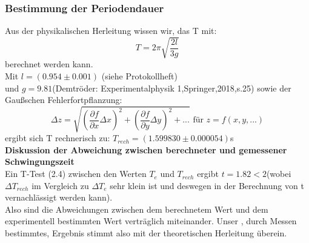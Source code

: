 \documentclass[11pt,a4paper]{article}
\begin{document}
	\subsubsection{Bestimmung der Periodendauer}
	Aus der physikalischen Herleitung wissen wir, das T mit:
	\begin{equation}
	T=2\pi \sqrt{\frac{2l}{3g}}
	\end{equation}
	berechnet werden kann.\\
	Mit $l=(0.954\pm 0.001)$ (siehe Protokollheft) \\ und $g=9.81$(Demtröder: Experimentalphysik 1,Springer,2018,s.25)
	sowie der Gaußschen Fehlerfortpflanzung:
	\begin{equation}
	\Delta z = \sqrt{(\frac{\partial f}{\partial x}\Delta x)^2 +(\frac {\partial f}{\partial y} \Delta y)^2+...} \text{   für   } z=f(x,y,...)
	\end{equation}
	ergibt sich T rechnerisch zu: $T_{rech}=(1.599830\pm0.000054)$s\\
	{\bf Diskussion der Abweichung zwischen berechneter und gemessener Schwingungszeit}\\
	Ein T-Test (2.4) zwischen den Werten $T_e$ und $T_{rech}$ ergibt $t=1.82<2$(wobei $\Delta T_{rech}$ im Vergleich zu $\Delta T_e$ sehr klein ist und deswegen in der Berechnung von t vernachlässigt werden kann).\\
	Also sind die Abweichungen zwischen dem berechnetem Wert und dem experimentell bestimmten Wert
	verträglich miteinander. Unser , durch Messen bestimmtes, Ergebnis stimmt also mit der theoretischen Herleitung überein.
	
	
\end{document}
